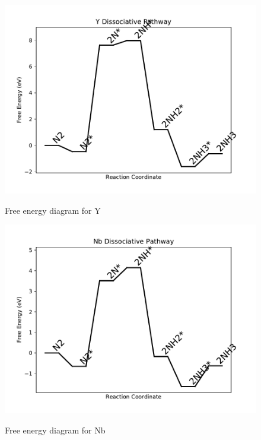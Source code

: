 \documentclass[journal=jacsat,manuscript=article]{achemso}
\begin{document}
\begin{figure}
\includegraphics[width=1\linewidth]{data/plots/Y_dissociative.pdf}
\label{fig:Y_dissociative}
\caption{Free energy diagram for Y}
\end{figure}

\newpage
\begin{figure}
\includegraphics[width=1\linewidth]{data/plots/Nb_dissociative.pdf}
\label{fig:Nb_dissociative}
\caption{Free energy diagram for Nb}
\end{figure}
\end{document}
